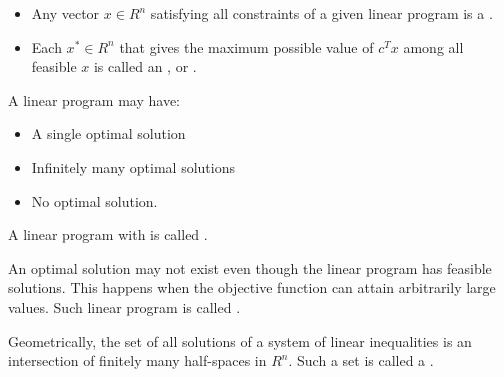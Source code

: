     \begin{itemize}
      \item Any vector $x \in R^n$ satisfying all constraints of a given linear program is a .
      \item Each $x^* \in R^n$ that gives the maximum possible value of $c^T x$ among all feasible $x$ is called an , or .
    \end{itemize}

    \par A linear program may have:
      \begin{itemize}
        \item A single optimal solution
        \item Infinitely many optimal solutions
        \item No optimal solution.
      \end{itemize}
    \par A linear program with  is called .
    \par An optimal solution may not exist even though the linear program has feasible solutions. This happens when the objective function can attain arbitrarily large values. Such linear program is called .

  \par {}

  \par Geometrically, the set of all solutions of a system of linear inequalities is an intersection of finitely many half-spaces in $R^n$. Such a set is called a .